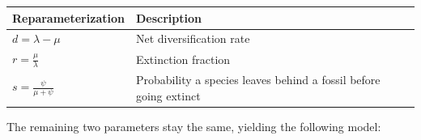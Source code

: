 \documentclass[12pt]{article}
\begin{document}
\renewcommand{\thetable}{2}
\begin{table}[h]
\centering
\begin{tabular}{ll}
\toprule
\textbf{Reparameterization} & \textbf{Description} \\
\midrule
$d = \lambda - \mu$ & Net diversification rate \\
$r = \frac{\mu}{\lambda}$ & Extinction fraction \\
$s = \frac{\psi}{\mu + \psi}$ & Probability a species leaves behind a fossil before going extinct \\
\bottomrule
\end{tabular}
\label{table2}
\end{table}

\noindent The remaining two parameters stay the same, yielding the following model:
\end{document}
